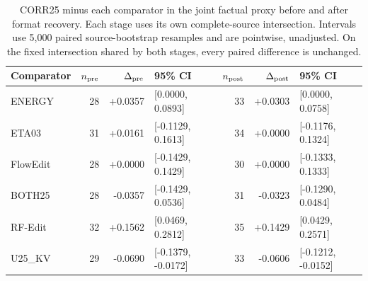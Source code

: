 \begin{table}[t]
\centering\small
\caption{CORR25 minus each comparator in the joint factual proxy before and after format recovery. Each stage uses its own complete-source intersection. Intervals use 5,000 paired source-bootstrap resamples and are pointwise, unadjusted. On the fixed intersection shared by both stages, every paired difference is unchanged.}
\label{tab:recovery-pairs}
\begin{tabular}{lrrlrrl}
\toprule
Comparator & $n_{\rm pre}$ & $\Delta_{\rm pre}$ & 95\% CI & $n_{\rm post}$ & $\Delta_{\rm post}$ & 95\% CI\\
\midrule
ENERGY & 28 & +0.0357 & [0.0000, 0.0893] & 33 & +0.0303 & [0.0000, 0.0758]\\
ETA03 & 31 & +0.0161 & [-0.1129, 0.1613] & 34 & +0.0000 & [-0.1176, 0.1324]\\
FlowEdit & 28 & +0.0000 & [-0.1429, 0.1429] & 30 & +0.0000 & [-0.1333, 0.1333]\\
BOTH25 & 28 & -0.0357 & [-0.1429, 0.0536] & 31 & -0.0323 & [-0.1290, 0.0484]\\
RF-Edit & 32 & +0.1562 & [0.0469, 0.2812] & 35 & +0.1429 & [0.0429, 0.2571]\\
U25\_KV & 29 & -0.0690 & [-0.1379, -0.0172] & 33 & -0.0606 & [-0.1212, -0.0152]\\
\bottomrule
\end{tabular}
\end{table}
